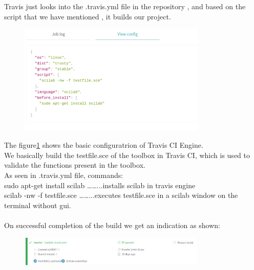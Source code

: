 \documentclass[12pt,a4paper]{report}
\begin{document}
Travis just looks into the .travis.yml file in the repository , and based on the script that we have mentioned , it builds our project.\\

\begin{figure}[H]
\centering
\includegraphics[width = 0.8\textwidth]{travisconfig.png}
\label{travisci}
\end{figure}
The figure\ref{travisci} shows the basic configuratrion of Travis CI Engine.\\

We basically build the testfile.sce of the toolbox in Travis CI, which is used to validate the functions present in the toolbox. \\
As seen in .travis.yml file, commands:\\
    sudo apt-get install scilab      ……...installs scilab in travis engine\\
    scilab -nw -f testfile.sce         ……...executes testfile.sce in a scilab window on the terminal without gui.\\\\

On successful completion of the build we get an indication as shown:\\
\begin{figure}[H]
\centering
\includegraphics[width = 0.8\textwidth]{travissuccess.png}
\end{figure}
\end{document}
